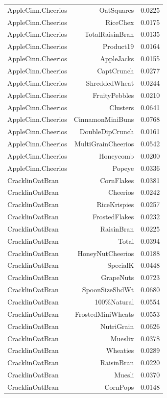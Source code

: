 \begin{longtable}{@{}lrr@{}}
AppleCinn.Cheerios & OatSquares & 0.0225 \\
AppleCinn.Cheerios & RiceChex & 0.0175 \\
AppleCinn.Cheerios & TotalRaisinBran & 0.0135 \\
AppleCinn.Cheerios & Product19 & 0.0164 \\
AppleCinn.Cheerios & AppleJacks & 0.0155 \\
AppleCinn.Cheerios & CaptCrunch & 0.0277 \\
AppleCinn.Cheerios & ShreddedWheat & 0.0244 \\
AppleCinn.Cheerios & FruityPebbles & 0.0210 \\
AppleCinn.Cheerios & Clusters & 0.0641 \\
AppleCinn.Cheerios & CinnamonMiniBuns & 0.0768 \\
AppleCinn.Cheerios & DoubleDipCrunch & 0.0161 \\
AppleCinn.Cheerios & MultiGrainCheerios & 0.0542 \\
AppleCinn.Cheerios & Honeycomb & 0.0200 \\
AppleCinn.Cheerios & Popeye & 0.0336 \\
CracklinOatBran & CornFlakes & 0.0381 \\
CracklinOatBran & Cheerios & 0.0242 \\
CracklinOatBran & RiceKrispies & 0.0257 \\
CracklinOatBran & FrostedFlakes & 0.0232 \\
CracklinOatBran & RaisinBran & 0.0225 \\
CracklinOatBran & Total & 0.0394 \\
CracklinOatBran & HoneyNutCheerios & 0.0188 \\
CracklinOatBran & SpecialK & 0.0448 \\
CracklinOatBran & GrapeNuts & 0.0723 \\
CracklinOatBran & SpoonSizeShdWt & 0.0680 \\
CracklinOatBran & 100\%Natural & 0.0554 \\
CracklinOatBran & FrostedMiniWheats & 0.0553 \\
CracklinOatBran & NutriGrain & 0.0626 \\
CracklinOatBran & Mueslix & 0.0378 \\
CracklinOatBran & Wheaties & 0.0289 \\
CracklinOatBran & RaisinBran & 0.0220 \\
CracklinOatBran & Muesli & 0.0370 \\
CracklinOatBran & CornPops & 0.0148 \\

\end{longtable}
